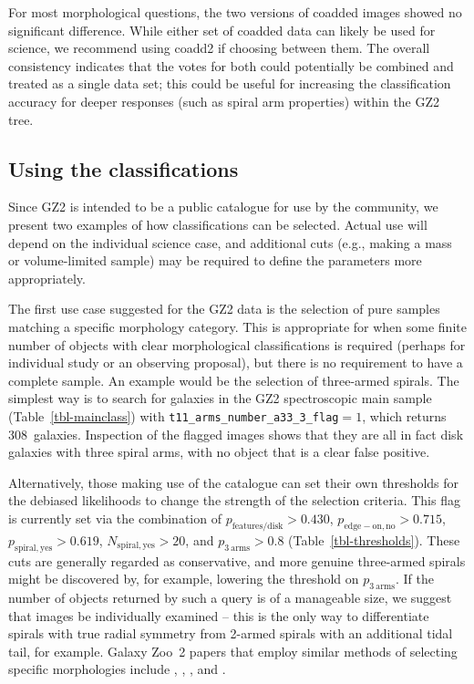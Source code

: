 \documentclass[useAMS,usenatbib]{mn2e}
\begin{document}
For most morphological questions, the two versions of coadded images showed no significant difference. While either set of coadded data can likely be used for science, we recommend using coadd2 if choosing between them. The overall consistency indicates that the votes for both could potentially be combined and treated as a single data set; this could be useful for increasing the classification accuracy for deeper responses (such as spiral arm properties) within the GZ2 tree.

\subsection{Using the classifications}\label{ssec-usingdata}

Since GZ2 is intended to be a public catalogue for use by the community, we present two examples of how classifications can be selected. Actual use will depend on the individual science case, and additional cuts (e.g., making a mass or volume-limited sample) may be required to define the parameters more appropriately.

The first use case suggested for the GZ2 data is the selection of pure samples matching a specific morphology category. This is appropriate for when some finite number of objects with clear morphological classifications is required (perhaps for individual study or an observing proposal), but there is no requirement to have a complete sample. An example would be the selection of three-armed spirals. The simplest way is to search for galaxies in the GZ2 spectroscopic main sample (Table~\ref{tbl-mainclass}) with {\tt t11\_arms\_number\_a33\_3\_flag}$ = 1$, which returns 308~galaxies. Inspection of the flagged images shows that they are all in fact disk galaxies with three spiral arms, with no object that is a clear false positive. 

Alternatively, those making use of the catalogue can set their own thresholds for the debiased likelihoods to change the strength of the selection criteria. This flag is currently set via the combination of $p_\mathrm{features/disk}>0.430$, $p_\mathrm{edge-on,no}>0.715$, $p_\mathrm{spiral,yes}>0.619$, $N_\mathrm{spiral,yes}>20$, and $p_\mathrm{3~arms}>0.8$ (Table~\ref{tbl-thresholds}). These cuts are generally regarded as conservative, and more genuine three-armed spirals might be discovered by, for example, lowering the threshold on $p_\mathrm{3~arms}$. If the number of objects returned by such a query is of a manageable size, we suggest that images be individually examined -- this is the only way to differentiate spirals with true radial symmetry from 2-armed spirals with an additional tidal tail, for example. Galaxy Zoo~2 papers that employ similar methods of selecting specific morphologies include \citet{mas11c}, \citet{kav12a}, \citet{sim13}, and \citet{cas13}. 
\end{document}
